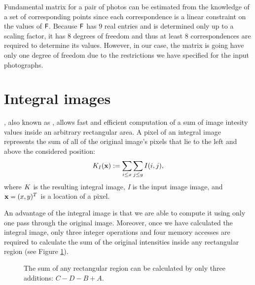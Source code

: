 Fundamental matrix for a pair of photos can be estimated from the knowledge of a set of corresponding points since each correspondence is a linear constraint on the values of $\mathsf{F}$. 
Because $\mathsf{F}$ has $9$ real entries and is determined only up to a scaling factor, it has $8$ degrees of freedom and thus at least $8$ correspondences are required to determine its values. 
However, in our case, the matrix is going have only one degree of freedom due to the restrictions we have specified for the input photographs. 

\section{Integral images}

, also known as , allows fast and efficient computation of a sum of image intesity values inside an arbitrary rectangular area.
A pixel of an integral image represents the sum of all of the original image's pixels that lie to the left and above the considered position: 
\begin{equation*}
K_I(\mathbf{x}) := \sum_{i \le x} \sum_{j \le y} I(i,j),
\end{equation*}
where $K$ is the resulting integral image, \emph{I} is the input image image, and $\mathbf{x} = (x, y)^{T}$ is a location of a pixel.

An advantage of the integral image is that we are able to compute it using only one pass through the original image. 
Moreover, once we have calculated the integral image, only three integer operations and four memory accesses are required to calculate the sum 
of the original intensities inside any rectangular region (see Figure \ref{fig:integral}).

\begin{figure}[h]
  \label{fig:integral}
  \caption{The sum of any rectangular region can be calculated by only three additions: $C - D - B + A$.}
 \end{figure}




